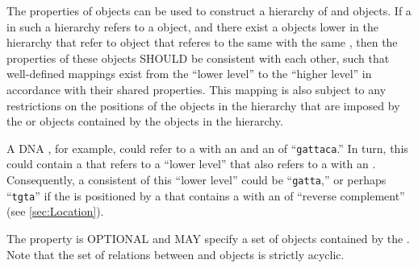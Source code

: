 The  properties of  objects can be used to construct a hierarchy of  and  objects.
If a  in such a hierarchy refers to a  object, and there exist a  objects lower in the hierarchy that refer to  object that referes to the same  with the same , then the  properties of these  objects SHOULD be consistent with each other, such that well-defined mappings exist from the ``lower level''  to the ``higher level''  in accordance with their shared  properties. This mapping is also subject to any restrictions on the positions of the  objects in the hierarchy that are imposed by the  or  objects contained by the  objects in the hierarchy.

A DNA , for example, could refer to a  with an   and an   of ``{\tt gattaca}.'' In turn, this  could contain a  that refers to a ``lower level''   that also refers to a  with an  . Consequently, a consistent   of this ``lower level''  could be ``{\tt gatta},'' or perhaps ``{\tt tgta}'' if the  is positioned by a  that contains a   with an  of ``reverse complement'' (see \ref{sec:Location}).

The  property is OPTIONAL and MAY specify a set of  objects contained by the .
Note that the set of relations between  and  objects is strictly acyclic.


